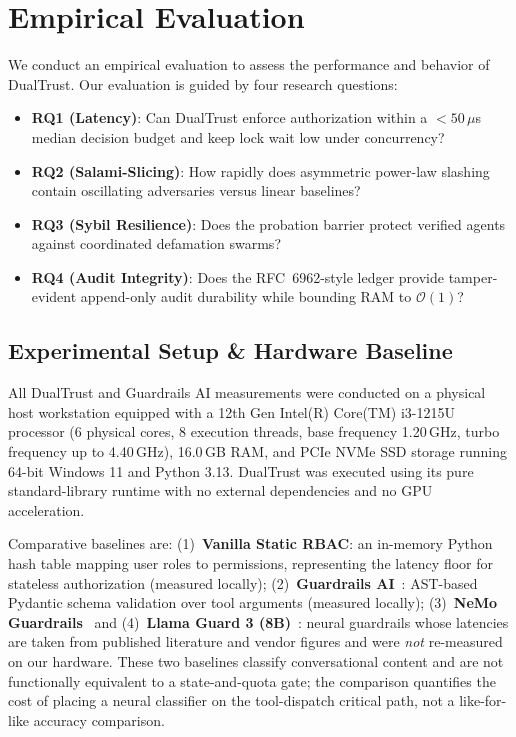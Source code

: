 \documentclass[journal]{IEEEtran}
\begin{document}
\section{Empirical Evaluation}
\label{sec:evaluation}

We conduct an empirical evaluation to assess the performance and behavior of DualTrust. Our evaluation is guided by four research questions:
\begin{itemize}[leftmargin=12pt, topsep=2pt, itemsep=1pt]
\item \textbf{RQ1 (Latency)}: Can DualTrust enforce authorization within a $<50\,\mu$s median decision budget and keep lock wait low under concurrency?
\item \textbf{RQ2 (Salami-Slicing)}: How rapidly does asymmetric power-law slashing contain oscillating adversaries versus linear baselines?
\item \textbf{RQ3 (Sybil Resilience)}: Does the probation barrier protect verified agents against coordinated defamation swarms?
\item \textbf{RQ4 (Audit Integrity)}: Does the RFC~6962-style ledger provide tamper-evident append-only audit durability while bounding RAM to $\mathcal{O}(1)$?
\end{itemize}

\subsection{Experimental Setup \& Hardware Baseline}
All DualTrust and Guardrails AI measurements were conducted on a physical host workstation equipped with a 12th Gen Intel(R) Core(TM) i3-1215U processor (6 physical cores, 8 execution threads, base frequency 1.20\,GHz, turbo frequency up to 4.40\,GHz), 16.0\,GB RAM, and PCIe NVMe SSD storage running 64-bit Windows 11 and Python 3.13. DualTrust was executed using its pure standard-library runtime with no external dependencies and no GPU acceleration.

Comparative baselines are: (1)~\textbf{Vanilla Static RBAC}: an in-memory Python hash table mapping user roles to permissions, representing the latency floor for stateless authorization (measured locally); (2)~\textbf{Guardrails AI}~\cite{rajpal2024guardrails}: AST-based Pydantic schema validation over tool arguments (measured locally); (3)~\textbf{NeMo Guardrails}~\cite{rebedea2023nemo} and (4)~\textbf{Llama Guard 3 (8B)}~\cite{inan2023llama}: neural guardrails whose latencies are taken from published literature and vendor figures and were \emph{not} re-measured on our hardware. These two baselines classify conversational content and are not functionally equivalent to a state-and-quota gate; the comparison quantifies the cost of placing a neural classifier on the tool-dispatch critical path, not a like-for-like accuracy comparison.
\end{document}
